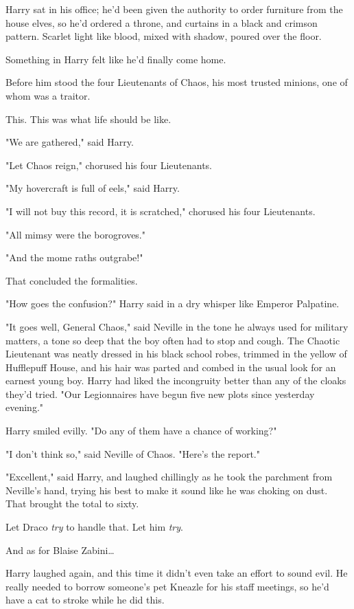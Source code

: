 Harry sat in his office; he'd been given the authority to order furniture from 
the house elves, so he'd ordered a throne, and curtains in a black and crimson 
pattern. Scarlet light like blood, mixed with shadow, poured over the floor.

Something in Harry felt like he'd finally come home.

Before him stood the four Lieutenants of Chaos, his most trusted minions, one 
of whom was a traitor.

This. This was what life should be like.

"We are gathered," said Harry.

"Let Chaos reign," chorused his four Lieutenants.

"My hovercraft is full of eels," said Harry.

"I will not buy this record, it is scratched," chorused his four Lieutenants.

"All mimsy were the borogroves."

"And the mome raths outgrabe!"

That concluded the formalities.

"How goes the confusion?" Harry said in a dry whisper like Emperor Palpatine.

"It goes well, General Chaos," said Neville in the tone he always used for 
military matters, a tone so deep that the boy often had to stop and cough. The 
Chaotic Lieutenant was neatly dressed in his black school robes, trimmed in the 
yellow of Hufflepuff House, and his hair was parted and combed in the usual 
look for an earnest young boy. Harry had liked the incongruity better than any 
of the cloaks they'd tried. "Our Legionnaires have begun five new plots since 
yesterday evening."

Harry smiled evilly. "Do any of them have a chance of working?"

"I don't think so," said Neville of Chaos. "Here's the report."

"Excellent," said Harry, and laughed chillingly as he took the parchment from 
Neville's hand, trying his best to make it sound like he was choking on dust. 
That brought the total to sixty.

Let Draco \emph{try} to handle that. Let him \emph{try}.

And as for Blaise Zabini{\ldots}

Harry laughed again, and this time it didn't even take an effort to sound evil. 
He really needed to borrow someone's pet Kneazle for his staff meetings, so 
he'd have a cat to stroke while he did this.

